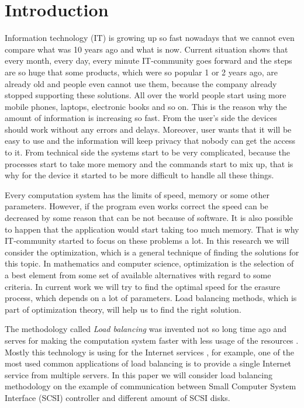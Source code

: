 \chapter{Introduction}
\label{chap1:title}

Information technology (IT) is growing up so fast nowadays that we cannot even compare what was 10 years ago and what is now. Current situation shows that every month, every day, every minute IT-community goes forward and the steps are so huge that some products, which were so popular 1 or 2 years ago, are already old and people even cannot use them, because the company already stopped supporting these solutions. All over the world people start using more mobile phones, laptops, electronic books and so on. This is the reason why the amount of information is increasing so fast. From the user’s side the devices should work without any errors and delays. Moreover, user wants that it will be easy to use and the information will keep privacy that nobody can get the access to it. From technical side the systems start to be very complicated, because the processes start to take more memory and the commands start to mix up, that is why for the device it started to be more difficult to handle all these things. 

Every computation system has the limits of speed, memory or some other parameters. However, if the program even works correct the speed can be decreased by some reason that can be not because of software. It is also possible to happen that the application would start taking too much memory. That is why IT-community started to focus on these problems a lot. In this research we will consider the optimization, which is a general technique of finding the solutions for this topic. In mathematics and computer science, optimization is the selection of a best element from some set of available alternatives with regard to some criteria. In current work we will try to find the optimal speed for the erasure process, which depends on a lot of parameters. Load balancing methods, which is part of optimization theory, will help us to find the right solution.

The methodology called \emph{Load balancing} was invented not so long time ago and serves for making the computation system faster with less usage of the resources \cite{load_bal}. Mostly this technology is using for the Internet services \cite{dyn_bal_web}, for example, one of the most used common applications of load balancing is to provide a single Internet service from multiple servers. In this paper we will consider load balancing methodology on the example of communication between Small Computer System Interface (SCSI) controller and different amount of SCSI disks. 

